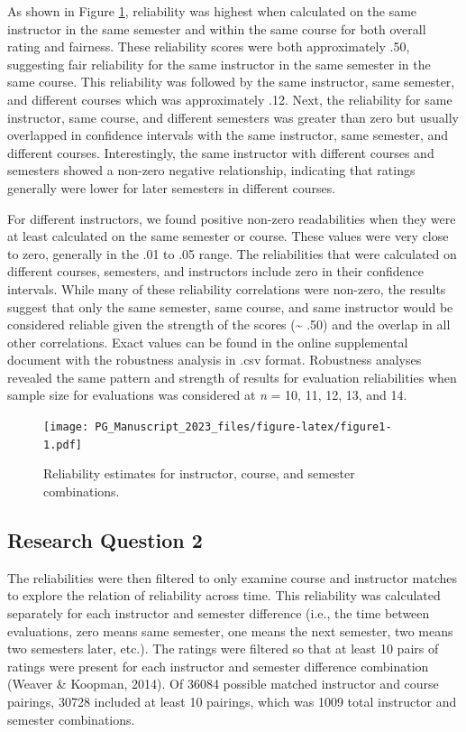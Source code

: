\documentclass[
  man]{apa7}
\begin{document}
As shown in Figure \ref{fig:figure1}, reliability was highest when
calculated on the same instructor in the same semester and within the
same course for both overall rating and fairness. These reliability
scores were both approximately .50, suggesting fair reliability for the
same instructor in the same semester in the same course. This
reliability was followed by the same instructor, same semester, and
different courses which was approximately .12. Next, the reliability for
same instructor, same course, and different semesters was greater than
zero but usually overlapped in confidence intervals with the same
instructor, same semester, and different courses. Interestingly, the
same instructor with different courses and semesters showed a non-zero
negative relationship, indicating that ratings generally were lower for
later semesters in different courses.

For different instructors, we found positive non-zero readabilities when
they were at least calculated on the same semester or course. These
values were very close to zero, generally in the .01 to .05 range. The
reliabilities that were calculated on different courses, semesters, and
instructors include zero in their confidence intervals. While many of
these reliability correlations were non-zero, the results suggest that
only the same semester, same course, and same instructor would be
considered reliable given the strength of the scores (\textasciitilde{} .50) and the
overlap in all other correlations. Exact values can be found in the
online supplemental document with the robustness analysis in .csv
format. Robustness analyses revealed the same pattern and strength of
results for evaluation reliabilities when sample size for evaluations
was considered at \emph{n} = 10, 11, 12, 13, and 14.

\begin{figure}
\centering
\texttt{[image: PG\_Manuscript\_2023\_files/figure-latex/figure1-1.pdf]}
\caption{\label{fig:figure1}Reliability estimates for instructor, course, and semester combinations.}
\end{figure}

\subsection{Research Question 2}\label{research-question-2-1}

The reliabilities were then filtered to only examine course and
instructor matches to explore the relation of reliability across time.
This reliability was calculated separately for each instructor and
semester difference (i.e., the time between evaluations, zero means same
semester, one means the next semester, two means two semesters later,
etc.). The ratings were filtered so that at least 10 pairs of ratings
were present for each instructor and semester difference combination
(Weaver \& Koopman, 2014). Of 36084 possible matched instructor and
course pairings,
30728 included at
least 10 pairings, which was 1009 total instructor and
semester combinations.
\end{document}
